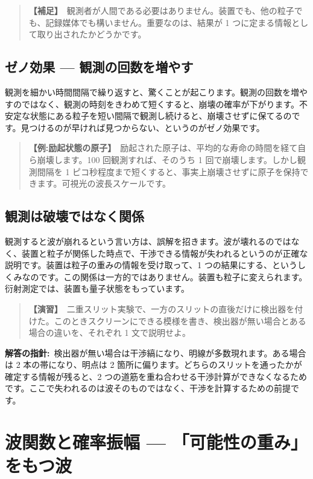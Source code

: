 \documentclass{article}
\begin{document}
\begin{quote}
\textbf{【補足】}\ 観測者が人間である必要はありません。装置でも、他の粒子でも、記録媒体でも構いません。重要なのは、結果が 1 つに定まる情報として取り出されたかどうかです。
\end{quote}

\subsection{ゼノ効果 — 観測の回数を増やす}

観測を細かい時間間隔で繰り返すと、驚くことが起こります。観測の回数を増やすのではなく、観測の時刻をきわめて短くすると、崩壊の確率が下がります。不安定な状態にある粒子を短い間隔で観測し続けると、崩壊させずに保てるのです。見つけるのが早ければ見つからない、というのがゼノ効果です。

\begin{quote}
\textbf{【例:励起状態の原子】}\ 励起された原子は、平均的な寿命の時間を経て自ら崩壊します。100 回観測すれば、そのうち 1 回で崩壊します。しかし観測間隔を 1 ピコ秒程度まで短くすると、事実上崩壊させずに原子を保持できます。可視光の波長スケールです。
\end{quote}

\subsection{観測は破壊ではなく関係}

観測すると波が崩れるという言い方は、誤解を招きます。波が壊れるのではなく、装置と粒子が関係した時点で、干渉できる情報が失われるというのが正確な説明です。装置は粒子の重みの情報を受け取って、1 つの結果にする、というしくみなのです。この関係は一方的ではありません。装置も粒子に変えられます。衍射測定では、装置も量子状態をもっています。

\begin{quote}
\textbf{【演習】}\ 二重スリット実験で、一方のスリットの直後だけに検出器を付けた。このときスクリーンにできる模様を書き、検出器が無い場合とある場合の違いを、それぞれ 1 文で説明せよ。
\end{quote}

\textbf{解答の指針:}\ 検出器が無い場合は干渉縞になり、明線が多数現れます。ある場合は 2 本の帯になり、明点は 2 箇所に偏ります。どちらのスリットを通ったかが確定する情報が残ると、2 つの道筋を重ね合わせる干渉計算ができなくなるためです。ここで失われるのは波そのものではなく、干渉を計算するための前提です。


\section{波関数と確率振幅 — 「可能性の重み」をもつ波}
\end{document}
